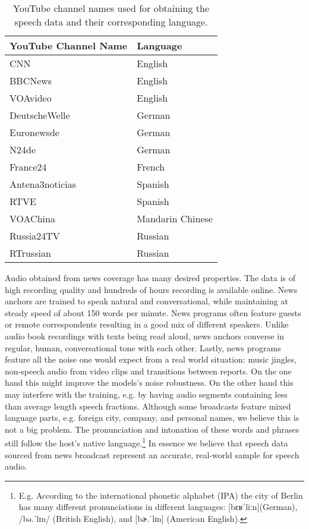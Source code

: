 	\begin{table}[]
	\centering
	\begin{tabularx}{\textwidth}{ll}
	\toprule
	YouTube Channel Name  & Language \\ \midrule
	CNN                   & English \\
	BBCNews               & English \\
	VOAvideo              & English \\
	DeutscheWelle         & German \\
	Euronewsde            & German \\
	N24de                 & German \\
	France24              & French \\
	Antena3noticias       & Spanish \\
	RTVE                  & Spanish \\
	VOAChina              & Mandarin Chinese  \\
	Russia24TV            & Russian \\
	RTrussian             & Russian \\ \bottomrule
	\end{tabularx}
	\caption{YouTube channel names used for obtaining the speech data and their corresponding language.}
	\label{tab:channels}
	\end{table}

  	
  	Audio obtained from news coverage has many desired properties. The data is of high recording quality and hundreds of hours recording is available online. News anchors are trained to speak natural and conversational, while maintaining at steady speed of about 150 words per minute\cite{Kantilaftis2016}. News programs often feature guests or remote correspondents resulting in a good mix of different speakers. Unlike audio book recordings with texts being read aloud, news anchors converse in regular, human, conversational tone with each other. Lastly, news programs feature all the noise one would expect from a real world situation: music jingles, non-speech audio from video clips and transitions between reports. On the one hand this might improve  the models's noise robustness. On the other hand this may interfere with the training, e.g. by having audio segments containing less than average length speech fractions. Although some broadcasts feature mixed language parts, e.g. foreign city, company, and personal names, we believe this is not a big problem. The pronunciation  and intonation of these words and phrases still follow the host's native language.\footnote{E.g. According to the international phonetic alphabet (IPA) the city of Berlin has many different pronunciations in different languages: [bɛʁˈliːn](German), /bə.ˈlɪn/ (British English), and [bɚ.ˈlɪn] (American English).}  In essence we believe that speech data sourced from news broadcast represent an accurate, real-world sample for speech audio.
  	
